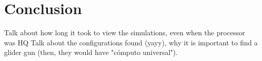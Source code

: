 
\section{Conclusion}
Talk about how long it took to view the simulations, even when the processor was HQ
Talk about the configurations found (yayy), why it is important to find a
glider gun (then, they would have "cómputo universal").
